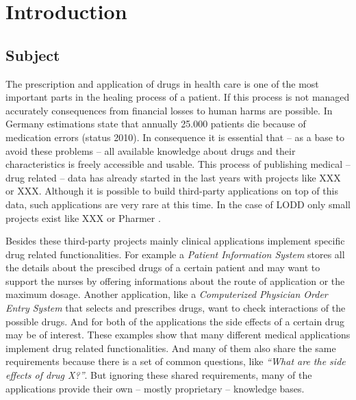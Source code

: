 \chapter{Introduction}
\label{cha:introduction-1}

\section{Subject}
\label{sec:subject}

The prescription and application of drugs in health care is one of the most important parts in the healing process of  a patient.
If this process is not managed accurately consequences from financial losses to  human harms are possible.
In Germany estimations state that annually 25.000 patients die because of medication errors \cite{pharzeit10} (status 2010).
In consequence it is essential that -- as a base to avoid these problems -- all available knowledge about drugs and their characteristics is freely accessible and usable.
This process of publishing medical -- drug related -- data has already started in the last years with projects like XXX or XXX.
Although it is possible to build third-party applications on top of this data, such applications are very rare at this time.
In the case of LODD only small projects exist like XXX or Pharmer \cite{khalili2013pharmer}.

Besides these third-party projects mainly clinical applications implement specific drug related functionalities.
For example a \textit{Patient Information System} stores all the details about the prescibed drugs of a certain patient and may want to support the nurses by offering informations about the route of application or the maximum dosage.
Another application, like a \textit{Computerized Physician Order Entry System} that selects and prescribes drugs, want to check interactions of the possible drugs.
And for both of the applications the side effects of a certain drug may be of interest.
These examples show that many different medical applications implement drug related functionalities.
And many of them also share the same requirements because there is a set of common questions, like \textit{``What are the side effects of drug X?''}.
But ignoring these shared requirements, many of the applications provide their own -- mostly proprietary -- knowledge bases.


